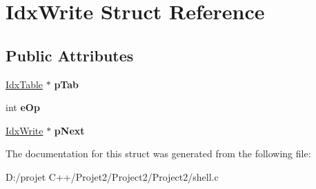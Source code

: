\hypertarget{struct_idx_write}{}\section{Idx\+Write Struct Reference}
\label{struct_idx_write}
\subsection*{Public Attributes}
\begin{DoxyCompactItemize}
\item 
\mbox{\label{struct_idx_write_a9b7972e3b3773e839d509fe9c2cd0ee0}} 
\mbox{\hyperlink{struct_idx_table}{Idx\+Table}} $\ast$ {\bfseries p\+Tab}
\item 
\mbox{\label{struct_idx_write_affab624d72c88dbcf0107b5b13191369}} 
int {\bfseries e\+Op}
\item 
\mbox{\label{struct_idx_write_aa10df5d9fa8af3583a3918509bba29ee}} 
\mbox{\hyperlink{struct_idx_write}{Idx\+Write}} $\ast$ {\bfseries p\+Next}
\end{DoxyCompactItemize}


The documentation for this struct was generated from the following file\+:\begin{DoxyCompactItemize}
\item 
D\+:/projet C++/\+Projet2/\+Project2/\+Project2/shell.\+c\end{DoxyCompactItemize}
